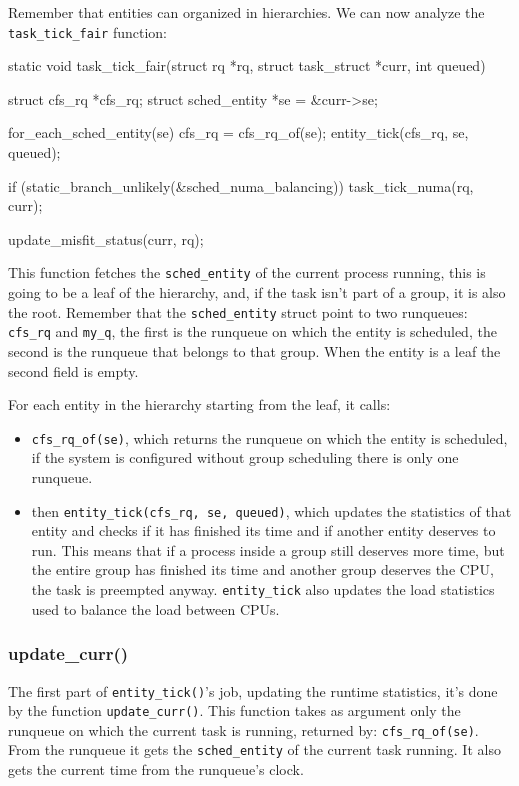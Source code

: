 \documentclass[10pt, oneside]{book}
\begin{document}
Remember that entities can organized in hierarchies.
We can now analyze the \verb|task_tick_fair| function:
\begin{code}
static void task_tick_fair(struct rq *rq, struct task_struct *curr, int queued)
{
  struct cfs_rq *cfs_rq;
  struct sched_entity *se = &curr->se;

  for_each_sched_entity(se) {
    cfs_rq = cfs_rq_of(se);
    entity_tick(cfs_rq, se, queued);
  }

  if (static_branch_unlikely(&sched_numa_balancing))
    task_tick_numa(rq, curr);

  update_misfit_status(curr, rq);
}
\end{code}

This function fetches the \verb|sched_entity| of the current process running, this is going to be a leaf of the hierarchy, and, if the task isn't part of a group, it is also the root. Remember that the \verb|sched_entity| struct point to two runqueues: \verb|cfs_rq| and \verb|my_q|, the first is the runqueue on which the entity is scheduled, the second is the runqueue that belongs to that group. When the entity is a leaf the second field is empty. 

For each entity in the hierarchy starting from the leaf, it calls:
\begin{itemize}
    \item \verb|cfs_rq_of(se)|, which returns the runqueue on which the entity is scheduled, if the system is configured without group scheduling there is only one runqueue.
    
    \item then \verb|entity_tick(cfs_rq, se, queued)|, which updates the statistics of that entity and checks if it has finished its time and if another entity deserves to run. This means that if a process inside a group still deserves more time, but the entire group has finished its time and another group deserves the CPU, the task is preempted anyway. \verb|entity_tick| also updates the load statistics used to balance the load between CPUs.
\end{itemize}

\subsubsection{update\_curr()}

The first part of \verb|entity_tick()|'s job, updating the runtime statistics, it's done by the function \verb|update_curr()|. This function takes as argument only the runqueue on which the current task is running, returned by: \verb|cfs_rq_of(se)|. From the runqueue it gets the \verb|sched_entity| of the current task running. It also gets the current time from the runqueue's clock.
\end{document}
